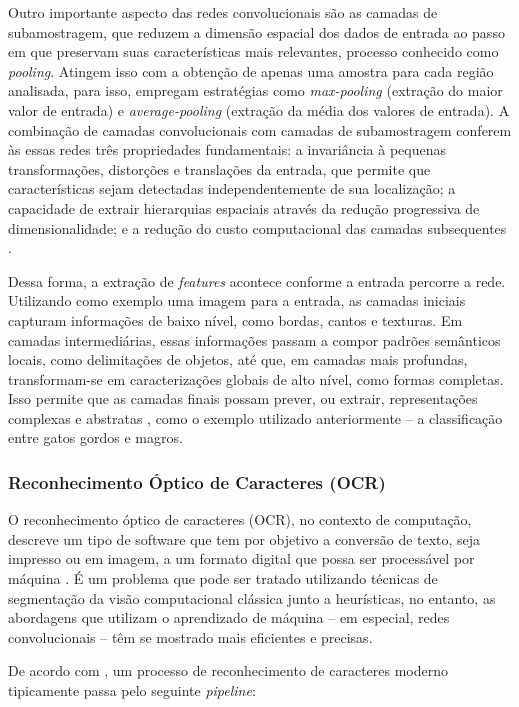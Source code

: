 Outro importante aspecto das redes convolucionais são as camadas de subamostragem, que reduzem a dimensão espacial dos dados de entrada ao passo em que preservam suas características mais relevantes, processo conhecido como \textit{pooling}. Atingem isso com a obtenção de apenas uma amostra para cada região analisada, para isso, empregam estratégias como \textit{max-pooling} (extração do maior valor de entrada) e \textit{average-pooling} (extração da média dos valores de entrada). A combinação de camadas convolucionais com camadas de subamostragem conferem às essas redes três propriedades fundamentais: a invariância à pequenas transformações, distorções e translações da entrada, que permite que características sejam detectadas independentemente de sua localização; a capacidade de extrair hierarquias espaciais através da redução progressiva de dimensionalidade; e a redução do custo computacional das camadas subsequentes \cite{origindl}.

Dessa forma, a extração de \textit{features} acontece conforme a entrada percorre a rede. Utilizando como exemplo uma imagem para a entrada, as camadas iniciais capturam informações de baixo nível, como bordas, cantos e texturas. Em camadas intermediárias, essas informações passam a compor padrões semânticos locais, como delimitações de objetos, até que, em camadas mais profundas, transformam-se em caracterizações globais de alto nível, como formas completas. Isso permite que as camadas finais possam prever, ou extrair, representações complexas e abstratas \cite{reviewdeep}, como o exemplo utilizado anteriormente -- a classificação entre gatos gordos e magros.

\subsubsection{Reconhecimento Óptico de Caracteres (OCR)}

O reconhecimento óptico de caracteres (OCR), no contexto de computação, descreve um tipo de software que tem por objetivo a conversão de texto, seja impresso ou em imagem, a um formato digital que possa ser processável por máquina \cite{ocr}. É um problema que pode ser tratado utilizando técnicas de segmentação da visão computacional clássica junto a heurísticas, no entanto, as abordagens que utilizam o aprendizado de máquina -- em especial, redes convolucionais -- têm se mostrado mais eficientes e precisas.

De acordo com \citeauthor*{ocr} \cite*{ocr}, um processo de reconhecimento de caracteres moderno tipicamente passa pelo seguinte \textit{pipeline}:

